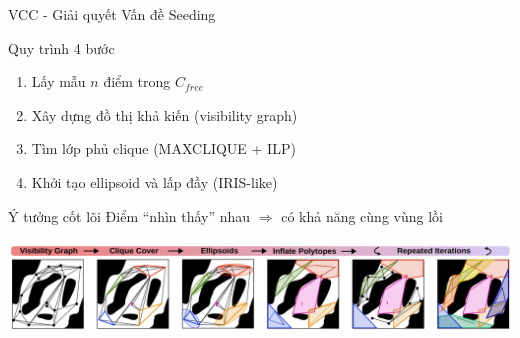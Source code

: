 \documentclass[aspectratio=169]{beamer}
\begin{document}
\begin{frame}{VCC - Giải quyết Vấn đề Seeding}
    \begin{block}{Quy trình 4 bước}
        \begin{enumerate}
            \item Lấy mẫu $n$ điểm trong $C_{free}$
            \item Xây dựng đồ thị khả kiến (visibility graph)
            \item Tìm lớp phủ clique (MAXCLIQUE + ILP)
            \item Khởi tạo ellipsoid và lấp đầy (IRIS-like)
        \end{enumerate}
    \end{block}

    \begin{block}{Ý tưởng cốt lõi}
        Điểm ``nhìn thấy'' nhau $\Rightarrow$ có khả năng cùng vùng lồi
    \end{block}

    \includegraphics[width=\textwidth]{../imgs/VCC.png}

\end{frame}
\end{document}
